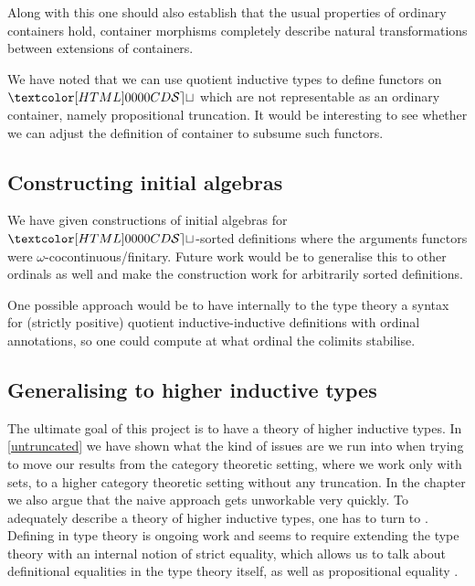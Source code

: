 Along with this one should also establish that the usual properties of
ordinary containers hold, \ie container morphisms completely describe
natural transformations between extensions of containers.

We have noted that we can use quotient inductive types to define
functors on $\SET$ which are not representable as an ordinary
container, namely propositional truncation. It would be interesting to
see whether we can adjust the definition of container to subsume such
functors.

\subsection{Constructing initial algebras}

We have given constructions of initial algebras for $\SET$-sorted
definitions where the arguments functors were
$\omega$-cocontinuous/finitary. Future work would be to generalise
this to other ordinals as well and make the construction work for
arbitrarily sorted definitions.

One possible approach would be to have internally to the type theory a
syntax for (strictly positive) quotient inductive-inductive
definitions with ordinal annotations, so one could compute at what
ordinal the colimits stabilise.

\subsection{Generalising to higher inductive types}

The ultimate goal of this project is to have a theory of higher
inductive types. In \cref{untruncated} we have shown what the kind of
issues are we run into when trying to move our results from the
category theoretic setting, where we work only with sets, to a higher
category theoretic setting without any truncation. In the chapter we
also argue that the naive approach gets unworkable very quickly. To
adequately describe a theory of higher inductive types, one has to
turn to \inftycats. Defining \inftycats in type theory is ongoing work
and seems to require extending the type theory with an internal notion
of strict equality, which allows us to talk about definitional
equalities in the type theory itself, as well as propositional
equality \cite{Altenkirch2016,Altenkirch2016iii}.
